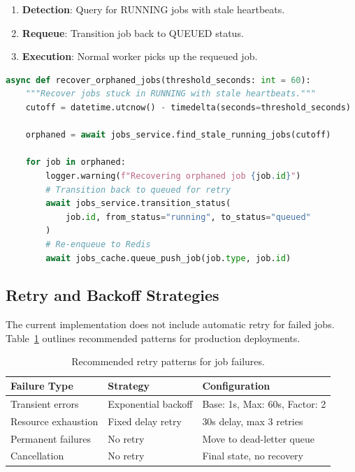 \begin{enumerate}
    \item \textbf{Detection}: Query for RUNNING jobs with stale heartbeats.
    \item \textbf{Requeue}: Transition job back to QUEUED status.
    \item \textbf{Execution}: Normal worker picks up the requeued job.
\end{enumerate}

\begin{lstlisting}[language=Python, caption={Orphaned job recovery (conceptual).}]
async def recover_orphaned_jobs(threshold_seconds: int = 60):
    """Recover jobs stuck in RUNNING with stale heartbeats."""
    cutoff = datetime.utcnow() - timedelta(seconds=threshold_seconds)
    
    orphaned = await jobs_service.find_stale_running_jobs(cutoff)
    
    for job in orphaned:
        logger.warning(f"Recovering orphaned job {job.id}")
        # Transition back to queued for retry
        await jobs_service.transition_status(
            job.id, from_status="running", to_status="queued"
        )
        # Re-enqueue to Redis
        await jobs_cache.queue_push_job(job.type, job.id)
\end{lstlisting}

\subsection{Retry and Backoff Strategies}

The current implementation does not include automatic retry for failed jobs. Table~\ref{tab:retry-recommendations} outlines recommended patterns for production deployments.

\begin{table}[ht]
\centering
\caption{Recommended retry patterns for job failures.}
\label{tab:retry-recommendations}
\small
\begin{tabular}{lll}
\hline
\textbf{Failure Type} & \textbf{Strategy} & \textbf{Configuration} \\
\hline
Transient errors & Exponential backoff & Base: 1s, Max: 60s, Factor: 2 \\
Resource exhaustion & Fixed delay retry & 30s delay, max 3 retries \\
Permanent failures & No retry & Move to dead-letter queue \\
Cancellation & No retry & Final state, no recovery \\
\hline
\end{tabular}
\end{table}

